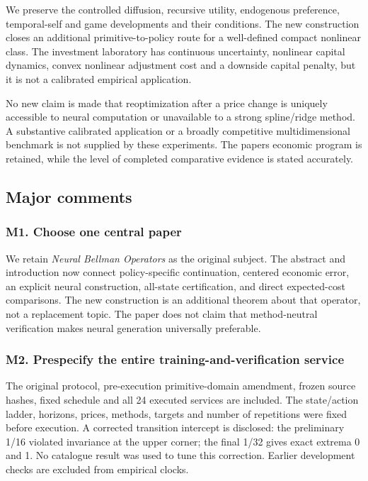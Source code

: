 \documentclass[ecta,nameyear,draft]{econsocart}
\begin{document}
We preserve the controlled diffusion, recursive utility, endogenous
preference, temporal-self and game developments and their conditions.
The new construction closes an additional primitive-to-policy route for
a well-defined compact nonlinear class. The investment laboratory has
continuous uncertainty, nonlinear capital dynamics, convex nonlinear
adjustment cost and a downside capital penalty, but it is not a
calibrated empirical application.

No new claim is made that reoptimization after a price change is
uniquely accessible to neural computation or unavailable to a strong
spline/ridge method. A substantive calibrated application or a broadly
competitive multidimensional benchmark is not supplied by these
experiments. The paper\textquotesingle s economic program is retained,
while the level of completed comparative evidence is stated accurately.

\hypertarget{major-comments}{%
\subsection{Major comments}\label{major-comments}}

\hypertarget{m1-choose-one-central-paper}{%
\subsubsection{M1. Choose one central
paper}\label{m1-choose-one-central-paper}}

We retain \emph{Neural Bellman Operators} as the original subject. The
abstract and introduction now connect policy-specific continuation,
centered economic error, an explicit neural construction, all-state
certification, and direct expected-cost comparisons. The new
construction is an additional theorem about that operator, not a
replacement topic. The paper does not claim that method-neutral
verification makes neural generation universally preferable.

\hypertarget{m2-prespecify-the-entire-training-and-verification-service}{%
\subsubsection{M2. Prespecify the entire training-and-verification
service}\label{m2-prespecify-the-entire-training-and-verification-service}}

The original protocol, pre-execution primitive-domain amendment, frozen
source hashes, fixed schedule and all 24 executed services are included.
The state/action ladder, horizons, prices, methods, targets and number
of repetitions were fixed before execution. A corrected transition
intercept is disclosed: the preliminary 1/16 violated invariance at the
upper corner; the final 1/32 gives exact extrema 0 and 1. No catalogue
result was used to tune this correction. Earlier development checks are
excluded from empirical clocks.
\end{document}

